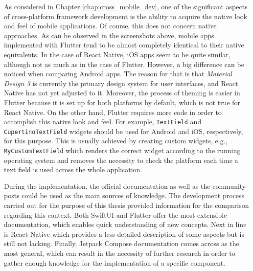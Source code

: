 As considered in Chapter \ref{chap:cross_mobile_dev}, one of the significant aspects of cross-platform framework development is the ability to acquire the native look and feel of mobile applications. Of course, this does not concern native approaches. As can be observed in the screenshots above, mobile apps implemented with Flutter tend to be almost completely identical to their native equivalents. In the case of React Native, iOS apps seem to be quite similar, although not as much as in the case of Flutter. However, a big difference can be noticed when comparing Android apps. The reason for that is that \emph{Material Design 3} is currently the primary design system for user interfaces, and React Native has not yet adjusted to it. Moreover, the process of theming is easier in Flutter because it is set up for both platforms by default, which is not true for React Native. On the other hand, Flutter requires more code in order to accomplish this native look and feel. For example, \texttt{TextField} and \texttt{CupertinoTextField} widgets should be used for Android and iOS, respectively, for this purpose. This is usually achieved by creating custom widgets, e.g., \texttt{MyCustomTextField} which renders the correct widget according to the running operating system and removes the necessity to check the platform each time a text field is used across the whole application.

During the implementation, the official documentation as well as the community posts could be used as the main sources of knowledge. The development process carried out for the purpose of this thesis provided information for the comparison regarding this context. Both SwiftUI and Flutter offer the most extensible documentation, which enables quick understanding of new concepts. Next in line is React Native which provides a less detailed description of some aspects but is still not lacking. Finally, Jetpack Compose documentation comes across as the most general, which can result in the necessity of further research in order to gather enough knowledge for the implementation of a specific component.

\clearpage
